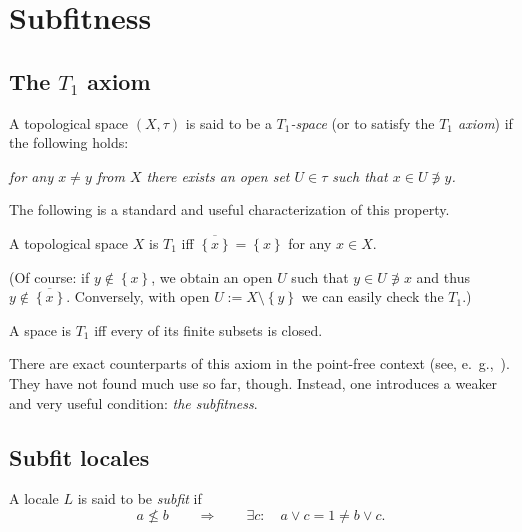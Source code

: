 \chapter{Subfitness}

\section{The $T_1$ axiom}

\begin{framed}
  \begin{df}[$T_1$]
    A topological space $(X, \tau)$ is said to be a \emph{$T_1$-space\/} (or to
    satisfy the \emph{$T_1$ axiom\/}) if the following holds:
    \begin{center} \it
      for any $x \ne y$ from $X$ there exists an open set $U\in \tau$ such that
      $x\in U \not\owns y$.
    \end{center}
  \end{df}
\end{framed}

The following is a standard and useful characterization of this property.

\begin{fact} \label{T1Char}
  A topological space $X$ is $T_1$ iff $\overline{\left\{x\right\}} =
  \left\{x\right\}$ for any $x\in X$.
\end{fact}

(Of course:
if $y\not\in \left\{x\right\}$, we obtain an open $U$ such that $y\in
U\not\owns x$ and thus $y\not\in \overline{\left\{x\right\}}$.
Conversely, with open $U:= X\setminus \left\{y\right\}$ we can easily check the
$T_1$.)

\begin{cor}
  A space is $T_1$ iff every of its finite subsets is closed.
\end{cor}

There are exact counterparts of this axiom in the point-free context (see,
e.~g.,~\cite{ds72}).
They have not found much use so far, though.
Instead, one introduces a weaker and very useful condition: {\sl the
subfitness\/}.

\section{Subfit locales}

\begin{framed}
  \begin{df}[Sfit]
    A locale $L$ is said to be \emph{subfit\/} if
    \[
      a \not\le b \qquad \Rightarrow \qquad \exists c: \quad a \vee c = 1 \ne b
      \vee c.
    \]
  \end{df}
\end{framed}

